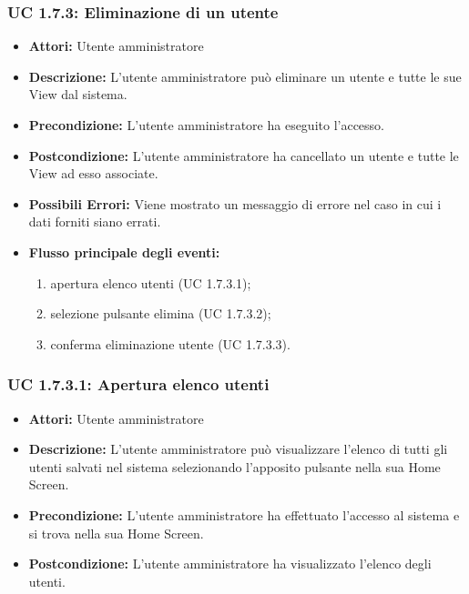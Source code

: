 \subsubsection{UC 1.7.3: Eliminazione di un utente}

\begin{itemize}
    \item \textbf{Attori:} Utente amministratore
    \item \textbf{Descrizione:} L'utente amministratore può eliminare un utente e tutte le sue View dal sistema.
    \item \textbf{Precondizione:} L'utente amministratore ha eseguito l'accesso.
    \item \textbf{Postcondizione:} L'utente amministratore ha cancellato un utente e tutte le View ad esso associate.
	\item \textbf{Possibili Errori:}
    Viene mostrato un messaggio di errore nel caso in cui i dati forniti siano errati.
    \item \textbf{Flusso principale degli eventi:}

    \begin{enumerate}
        \item apertura elenco utenti (UC 1.7.3.1);
        \item selezione pulsante elimina (UC 1.7.3.2);
        \item conferma eliminazione utente (UC 1.7.3.3).
    \end{enumerate}

\end{itemize}

\subsubsection{UC 1.7.3.1: Apertura elenco utenti}

\begin{itemize}
    \item \textbf{Attori:} Utente amministratore
    \item \textbf{Descrizione:} L'utente amministratore può visualizzare l'elenco di tutti gli utenti salvati nel sistema selezionando l'apposito pulsante nella sua Home Screen.
    \item \textbf{Precondizione:} L'utente amministratore ha effettuato l'accesso al sistema e si trova nella sua Home Screen.
    \item \textbf{Postcondizione:} L'utente amministratore ha visualizzato l'elenco degli utenti.
\end{itemize}

